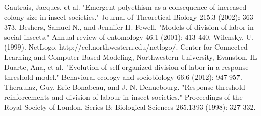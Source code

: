 \documentclass[a4paper]{article}
\begin{document}
\pagebreak
\begin{thebibliography}{9}

Gautrais, Jacques, et al. "Emergent polyethism as a consequence of increased colony size in insect societies." Journal of Theoretical Biology 215.3 (2002): 363-373.
Beshers, Samuel N., and Jennifer H. Fewell. "Models of division of labor in social insects." Annual review of entomology 46.1 (2001): 413-440.
Wilensky, U. (1999). NetLogo. http://ccl.northwestern.edu/netlogo/. Center for Connected Learning and Computer-Based Modeling, Northwestern University, Evanston, IL
Duarte, Ana, et al. "Evolution of self-organized division of labor in a response threshold model." Behavioral ecology and sociobiology 66.6 (2012): 947-957.
Theraulaz, Guy, Eric Bonabeau, and J. N. Denuebourg. "Response threshold reinforcements and division of labour in insect societies." Proceedings of the Royal Society of London. Series B: Biological Sciences 265.1393 (1998): 327-332.

\end{thebibliography}

\clearpage
\end{document}
